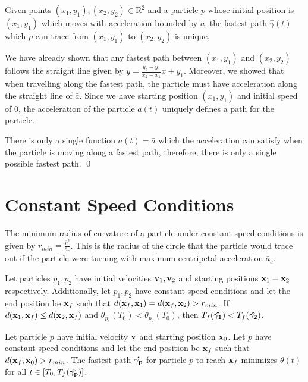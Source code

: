 \begin{corollary}
  Given points $(x_1, y_1), (x_2, y_2) \in \mathrm{R}^2$ and a particle $p$ whose initial position is $(x_1, y_1)$ which moves with acceleration bounded by $\bar{a}$, the fastest path $\hat{\gamma}(t)$ which $p$ can trace from $(x_1, y_1)$ to $(x_2, y_2)$ is unique.
\end{corollary}
\proof We have already shown that any fastest path between $(x_1, y_1)$ and $(x_2, y_2)$ follows the straight line given by $y = \frac{y_2 - y_1}{x_2 - x_1} x + y_1$. Moreover, we showed that when travelling along the fastest path, the particle must have acceleration along the straight line of $\bar{a}$. Since we have starting position $(x_1, y_1)$ and initial speed of $0$, the acceleration of the particle $a(t)$ uniquely defines a path for the particle.

There is only a single function $a(t) = \bar{a}$ which the acceleration can satisfy when the particle is moving along a fastest path, therefore, there is only a single possible fastest path.
\qed



\section{Constant Speed Conditions}

\begin{definition}
  The minimum radius of curvature of a particle under constant speed conditions is given by $r_{min} = \frac{\bar{v}^2}{\bar{a}_c}$. This is the radius of the circle that the particle would trace out if the particle were turning with maximum centripetal acceleration $\bar{a}_c$.
\end{definition}

\begin{conjecture}
  Let particles $p_1, p_2$ have initial velocities $\mathbf{v}_1, \mathbf{v}_2$ and starting positions $\mathbf{x}_1 = \mathbf{x}_2$ respectively. Additionally, let $p_1, p_2$ have constant speed conditions and let the end position be $\mathbf{x}_f$ such that $d(\mathbf{x}_f, \mathbf{x}_1) = d(\mathbf{x}_f, \mathbf{x}_2) > r_{min}$. If $d(\mathbf{x}_1, \mathbf{x}_f) \leq d(\mathbf{x}_2, \mathbf{x}_f)$ and $\theta_{p_1}(T_0) < \theta_{p_2}(T_0)$, then $T_f(\mathbf{\hat{\gamma_1}}) < T_f(\mathbf{\hat{\gamma_2}})$.
\end{conjecture}

\begin{theorem}
  Let particle $p$ have initial velocity $\mathbf{v}$ and starting position $\mathbf{x}_0$. Let $p$ have constant speed conditions and let the end position be $\mathbf{x}_f$ such that $d(\mathbf{x}_f, \mathbf{x}_0) > r_{min}$. The fastest path $\mathbf{\hat{\gamma_p}}$ for particle $p$ to reach $\mathbf{x}_f$ minimizes $\theta(t)$ for all $t \in [T_0, T_f(\mathbf{\hat{\gamma_p}})]$.
  \label{theorem:restricted-theta}
\end{theorem}

